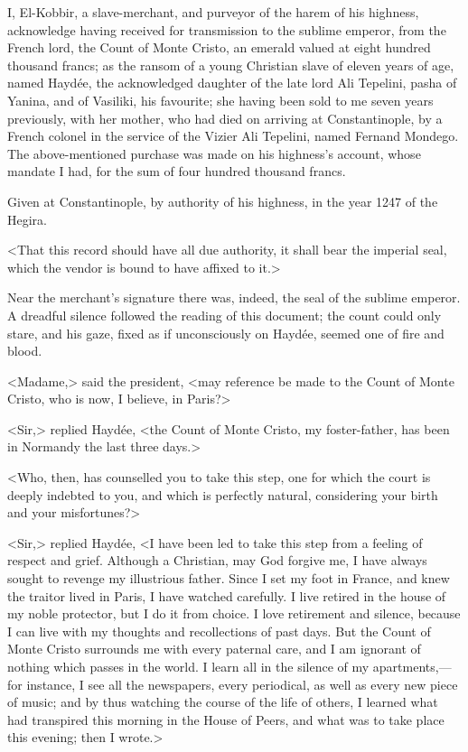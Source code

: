 \begin{mail}{}{}
I, El-Kobbir, a slave-merchant, and purveyor of the harem of his highness, acknowledge having received for transmission to the sublime emperor, from the French lord, the Count of Monte Cristo, an emerald valued at eight hundred thousand francs; as the ransom of a young Christian slave of eleven years of age, named Haydée, the acknowledged daughter of the late lord Ali Tepelini, pasha of Yanina, and of Vasiliki, his favourite; she having been sold to me seven years previously, with her mother, who had died on arriving at Constantinople, by a French colonel in the service of the Vizier Ali Tepelini, named Fernand Mondego. The above-mentioned purchase was made on his highness's account, whose mandate I had, for the sum of four hundred thousand francs. 

Given at Constantinople, by authority of his highness, in the year 1247 of the Hegira. 

\end{mail}

<That this record should have all due authority, it shall bear the imperial seal, which the vendor is bound to have affixed to it.> 

Near the merchant's signature there was, indeed, the seal of the sublime emperor. A dreadful silence followed the reading of this document; the count could only stare, and his gaze, fixed as if unconsciously on Haydée, seemed one of fire and blood. 

<Madame,> said the president, <may reference be made to the Count of Monte Cristo, who is now, I believe, in Paris?> 

<Sir,> replied Haydée, <the Count of Monte Cristo, my foster-father, has been in Normandy the last three days.> 

<Who, then, has counselled you to take this step, one for which the court is deeply indebted to you, and which is perfectly natural, considering your birth and your misfortunes?>

<Sir,> replied Haydée, <I have been led to take this step from a feeling of respect and grief. Although a Christian, may God forgive me, I have always sought to revenge my illustrious father. Since I set my foot in France, and knew the traitor lived in Paris, I have watched carefully. I live retired in the house of my noble protector, but I do it from choice. I love retirement and silence, because I can live with my thoughts and recollections of past days. But the Count of Monte Cristo surrounds me with every paternal care, and I am ignorant of nothing which passes in the world. I learn all in the silence of my apartments,—for instance, I see all the newspapers, every periodical, as well as every new piece of music; and by thus watching the course of the life of others, I learned what had transpired this morning in the House of Peers, and what was to take place this evening; then I wrote.>  

